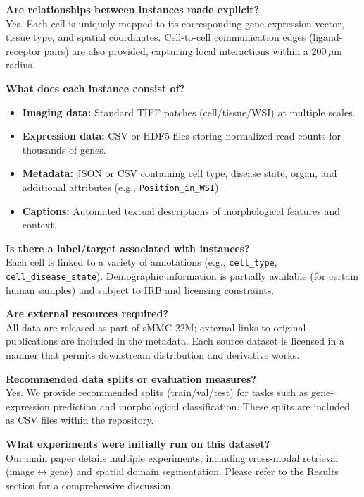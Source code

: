 \documentclass{article}
\newcommand{\dataset}{sMMC-22M\xspace}
\begin{document}
\noindent
\textbf{Are relationships between instances made explicit?} \\
Yes. Each cell is uniquely mapped to its corresponding gene expression vector, tissue type, and spatial coordinates. Cell-to-cell communication edges (ligand-receptor pairs) are also provided, capturing local interactions within a 200\,$\mu$m radius.

\noindent
\textbf{What does each instance consist of?} \\
\begin{itemize}
    \item \textbf{Imaging data:} Standard TIFF patches (cell/tissue/WSI) at multiple scales.
    \item \textbf{Expression data:} CSV or HDF5 files storing normalized read counts for thousands of genes.
    \item \textbf{Metadata:} JSON or CSV containing cell type, disease state, organ, and additional attributes (e.g., \texttt{Position\_in\_WSI}).
    \item \textbf{Captions:} Automated textual descriptions of morphological features and context.
\end{itemize}

\noindent
\textbf{Is there a label/target associated with instances?} \\
Each cell is linked to a variety of annotations (e.g., \texttt{cell\_type}, \texttt{cell\_disease\_state}). Demographic information is partially available (for certain human samples) and subject to IRB and licensing constraints.

\noindent
\textbf{Are external resources required?} \\
All data are released as part of \dataset; external links to original publications are included in the metadata. Each source dataset is licensed in a manner that permits downstream distribution and derivative works.

\noindent
\textbf{Recommended data splits or evaluation measures?} \\
Yes. We provide recommended splits (train/val/test) for tasks such as gene-expression prediction and morphological classification. These splits are included as CSV files within the repository.

\noindent
\textbf{What experiments were initially run on this dataset?} \\
Our main paper details multiple experiments, including cross-modal retrieval (image$\leftrightarrow$gene) and spatial domain segmentation. Please refer to the Results section for a comprehensive discussion.
\end{document}
